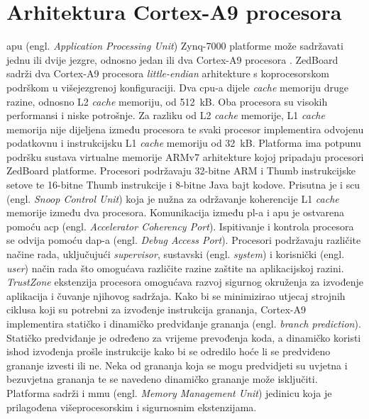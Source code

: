 \documentclass[times, utf8, diplomski, numeric]{fer}
\begin{document}
\chapter{Arhitektura Cortex-A9 procesora}
\gls{apu} (engl. \textit{Application Processing Unit}) Zynq-7000 platforme može sadržavati jednu ili dvije jezgre, odnosno jedan
ili dva Cortex-A9 procesora \cite{zynq_trm}. ZedBoard sadrži dva Cortex-A9 procesora \textit{little-endian} arhitekture s
koprocesorskom podrškom u višejezgrenoj konfiguraciji. Dva \gls{cpu}-a dijele \textit{cache} memoriju druge razine,
odnosno L2 \textit{cache} memoriju, od 512~kB.
Oba procesora su visokih performansi i niske potrošnje. Za razliku od L2 \textit{cache} memorije, L1 \textit{cache}
memorija nije dijeljena između procesora te svaki procesor implementira odvojenu podatkovnu i instrukcijsku
L1 \textit{cache} memoriju od 32~kB. Platforma ima potpunu podršku sustava virtualne memorije ARMv7 arhitekture kojoj
pripadaju procesori ZedBoard platforme. Procesori podržavaju 32-bitne ARM i Thumb instrukcijske setove te 16-bitne
Thumb instrukcije i 8-bitne Java bajt kodove. Prisutna je i \gls{scu} (engl. \textit{Snoop Control Unit}) koja je nužna za održavanje
koherencije L1 \textit{cache} memorije između dva procesora. Komunikacija između \gls{pl}-a i \gls{apu} je ostvarena
pomoću \gls{acp} (engl. \textit{Accelerator Coherency Port}). Ispitivanje i kontrola procesora se odvija pomoću \gls{dap}-a
(engl. \textit{Debug Access Port}). Procesori podržavaju različite načine rada, uključujući \textit{supervisor},
sustavski (engl. \textit{system}) i korisnički (engl. \textit{user}) način rada što omogućava različite razine
zaštite na aplikacijskoj razini. \textit{TrustZone} ekstenzija procesora omogućava razvoj sigurnog okruženja za
izvođenje aplikacija i čuvanje njihovog sadržaja. Kako bi se minimizirao utjecaj strojnih ciklusa koji su potrebni
za izvođenje instrukcija grananja, Cortex-A9 implementira statičko i dinamičko predviđanje grananja (engl.
\textit{branch prediction}). Statičko predviđanje je određeno za vrijeme prevođenja koda, a dinamičko koristi
ishod izvođenja prošle instrukcije kako bi se odredilo hoće li se predviđeno grananje izvesti ili ne. Neka od
grananja koja se mogu predvidjeti su uvjetna i bezuvjetna grananja te se navedeno dinamičko grananje može isključiti.
Platforma sadrži i \gls{mmu} (engl. \textit{Memory Management Unit}) jedinicu koja je prilagođena višeprocesorskim i sigurnosnim
ekstenzijama.
\end{document}
